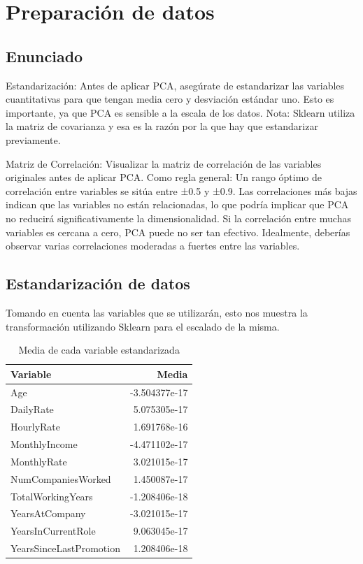 \newpage
\section{Preparación de datos}
\subsection{Enunciado}
Estandarización: Antes de aplicar PCA, asegúrate de estandarizar las variables cuantitativas para que tengan media cero y desviación estándar uno. Esto es importante, ya que PCA es sensible a la escala de los datos. Nota: Sklearn utiliza la matriz de covarianza y esa es la razón por la que hay que estandarizar previamente. 

Matriz de Correlación: Visualizar la matriz de correlación de las variables originales antes de aplicar PCA. Como regla general:
Un rango óptimo de correlación entre variables se sitúa entre ±0.5 y ±0.9. Las correlaciones más bajas indican que las variables no están relacionadas, lo que podría implicar que PCA no reducirá significativamente la dimensionalidad. Si la correlación entre muchas variables es cercana a cero, PCA puede no ser tan efectivo. Idealmente, deberías observar varias correlaciones moderadas a fuertes entre las variables.

\subsection{Estandarización de datos}
Tomando en cuenta las variables que se utilizarán, esto nos muestra la transformación utilizando Sklearn para el escalado de la misma.

\begin{table}[H]
\centering
\begin{tabular}{|l|r|}
\hline
\textbf{Variable} & \textbf{Media} \\ \hline
Age                       & -3.504377e-17 \\ \hline
DailyRate                  &  5.075305e-17 \\ \hline
HourlyRate                 &  1.691768e-16 \\ \hline
MonthlyIncome              & -4.471102e-17 \\ \hline
MonthlyRate                &  3.021015e-17 \\ \hline
NumCompaniesWorked         &  1.450087e-17 \\ \hline
TotalWorkingYears          & -1.208406e-18 \\ \hline
YearsAtCompany             & -3.021015e-17 \\ \hline
YearsInCurrentRole         &  9.063045e-17 \\ \hline
YearsSinceLastPromotion    &  1.208406e-18 \\ \hline
\end{tabular}
\caption{Media de cada variable estandarizada}
\end{table}


